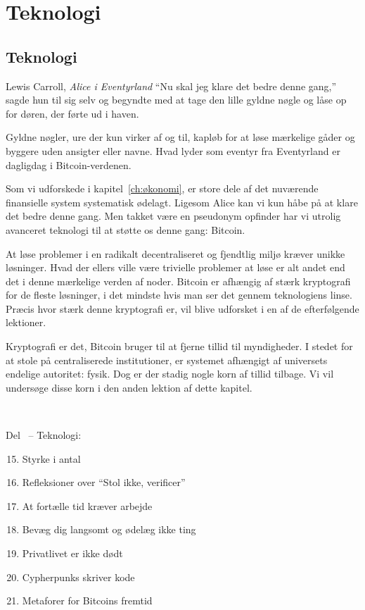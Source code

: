 \part{Teknologi}
\label{ch:teknologi}
\chapter*{Teknologi}

\begin{chapquote}{Lewis Carroll, \textit{Alice i Eventyrland}}
\enquote{Nu skal jeg klare det bedre denne gang,} sagde hun til sig selv og 
begyndte med at tage den lille gyldne nøgle og låse op for døren, der førte ud 
i haven. 
\end{chapquote}

Gyldne nøgler, ure der kun virker af og til, kapløb for at løse
mærkelige gåder og byggere uden ansigter eller navne. Hvad lyder som
eventyr fra Eventyrland er dagligdag i Bitcoin-verdenen.

Som vi udforskede i kapitel~\ref{ch:økonomi}, er store dele af det nuværende 
finansielle system systematisk ødelagt. Ligesom Alice kan vi kun håbe på at 
klare det bedre denne gang. Men takket være en pseudonym opfinder har vi utrolig
avanceret teknologi til at støtte os denne gang: Bitcoin.

At løse problemer i en radikalt decentraliseret og fjendtlig miljø
kræver unikke løsninger. Hvad der ellers ville være trivielle problemer at løse
er alt andet end det i denne mærkelige verden af noder. Bitcoin er afhængig af 
stærk kryptografi for de fleste løsninger, i det mindste hvis man ser det gennem
teknologiens linse. Præcis hvor stærk denne kryptografi er, vil blive udforsket 
i en af de efterfølgende lektioner.

Kryptografi er det, Bitcoin bruger til at fjerne tillid til myndigheder.
I stedet for at stole på centraliserede institutioner, er systemet afhængigt 
af universets endelige autoritet: fysik. Dog er der stadig nogle korn af tillid 
tilbage. Vi vil undersøge disse korn i den anden lektion af dette kapitel.

~

\begin{samepage}
Del~\ref{ch:teknologi} -- Teknologi:

\begin{enumerate}
  \setcounter{enumi}{14}
  \item Styrke i antal
  \item Refleksioner over \enquote{Stol ikke, verificer}
  \item At fortælle tid kræver arbejde
  \item Bevæg dig langsomt og ødelæg ikke ting
  \item Privatlivet er ikke dødt
  \item Cypherpunks skriver kode
  \item Metaforer for Bitcoins fremtid
\end{enumerate}
\end{samepage}

